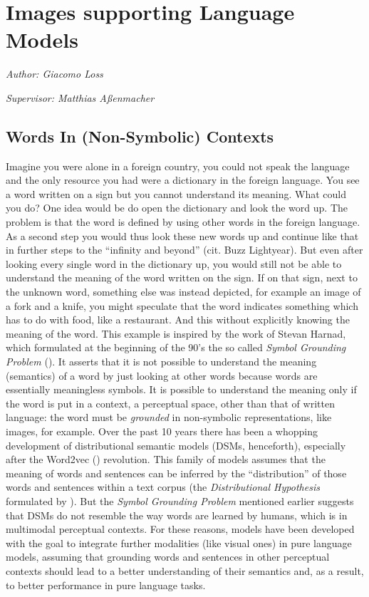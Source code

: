 \documentclass[
]{krantz}
\begin{document}
\hypertarget{c02-03-img-support-text}{%
\section{Images supporting Language Models}\label{c02-03-img-support-text}}

\emph{Author: Giacomo Loss}

\emph{Supervisor: Matthias Aßenmacher}

\hypertarget{words-in-non-symbolic-contexts}{%
\subsection{Words In (Non-Symbolic) Contexts}\label{words-in-non-symbolic-contexts}}

Imagine you were alone in a foreign country, you could not speak the language and the only resource you had were a dictionary in the foreign language. You see a word written on a sign but you cannot understand its meaning. What could you do? One idea would be do open the dictionary and look the word up. The problem is that the word is defined by using other words in the foreign language. As a second step you would thus look these new words up and continue like that in further steps to the ``infinity and beyond'' (cit. Buzz Lightyear). But even after looking every single word in the dictionary up, you would still not be able to understand the meaning of the word written on the sign. If on that sign, next to the unknown word, something else was instead depicted, for example an image of a fork and a knife, you might speculate that the word indicates something which has to do with food, like a restaurant. And this without explicitly knowing the meaning of the word. This example is inspired by the work of Stevan Harnad, which formulated at the beginning of the 90's the so called \emph{Symbol Grounding Problem} (\citet{harnad1990symbol}). It asserts that it is not possible to understand the meaning (semantics) of a word by just looking at other words because words are essentially meaningless symbols. It is possible to understand the meaning only if the word is put in a context, a perceptual space, other than that of written language: the word must be \emph{grounded} in non-symbolic representations, like images, for example. Over the past 10 years there has been a whopping development of distributional semantic models (DSMs, henceforth), especially after the Word2vec (\citet{mikolov2013efficient}) revolution. This family of models assumes that the meaning of words and sentences can be inferred by the ``distribution'' of those words and sentences within a text corpus (the \emph{Distributional Hypothesis} formulated by \citet{harris1954distributional}). But the \emph{Symbol Grounding Problem} mentioned earlier suggests that DSMs do not resemble the way words are learned by humans, which is in multimodal perceptual contexts. For these reasons, models have been developed with the goal to integrate further modalities (like visual ones) in pure language models, assuming that grounding words and sentences in other perceptual contexts should lead to a better understanding of their semantics and, as a result, to better performance in pure language tasks.
\end{document}
